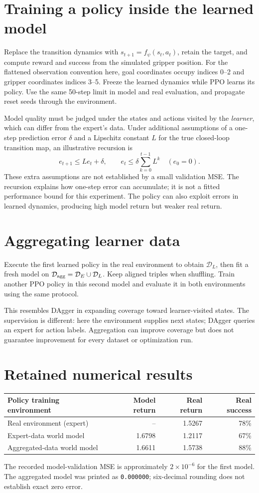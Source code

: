 \newpage
\section{Training a policy inside the learned model}
Replace the transition dynamics with $s_{t+1}=f_\psi(s_t,a_t)$, retain the
target, and compute reward and success from the simulated gripper position.
For the flattened observation convention here, goal coordinates occupy
indices 0--2 and gripper coordinates indices 3--5. Freeze the learned dynamics
while PPO learns its policy. Use the same 50-step limit in model and real
evaluation, and propagate reset seeds through the environment.

Model quality must be judged under the states and actions visited by the
\emph{learner}, which can differ from the expert's data. Under additional
assumptions of a one-step prediction error $\delta$ and a Lipschitz constant
$L$ for the true closed-loop transition map, an illustrative recursion is
\[
 e_{t+1}\leq Le_t+\delta,\qquad
 e_t\leq\delta\sum_{k=0}^{t-1}L^k\quad(e_0=0).
\]
These extra assumptions are not established by a small validation MSE. The
recursion explains how one-step error can accumulate; it is not a fitted
performance bound for this experiment. The policy can also exploit errors
in learned dynamics, producing high model return but weaker real return.

\section{Aggregating learner data}
Execute the first learned policy in the real environment to obtain
$\mathcal D_L$, then fit a fresh model on
$\mathcal D_{\rm agg}=\mathcal D_E\cup\mathcal D_L$. Keep aligned triples
when shuffling. Train another PPO policy in this second model and evaluate
it in both environments using the same protocol.

This resembles DAgger in expanding coverage toward learner-visited states.
The supervision is different: here the environment supplies next states;
DAgger queries an expert for action labels. Aggregation can improve coverage
but does not guarantee improvement for every dataset or optimization run.

\section{Retained numerical results}
\historical
\begin{center}
\begin{tabular}{lrrr}
\toprule Policy training environment & Model return & Real return & Real success\\\midrule
Real environment (expert) & -- & 1.5267 & 78\%\\
Expert-data world model & 1.6798 & 1.2117 & 67\%\\
Aggregated-data world model & 1.6611 & 1.5738 & 88\%\\\bottomrule
\end{tabular}
\end{center}
The recorded model-validation MSE is approximately $2\times10^{-6}$ for
the first model. The aggregated model was printed as \texttt{0.000000};
six-decimal rounding does not establish exact zero error.

